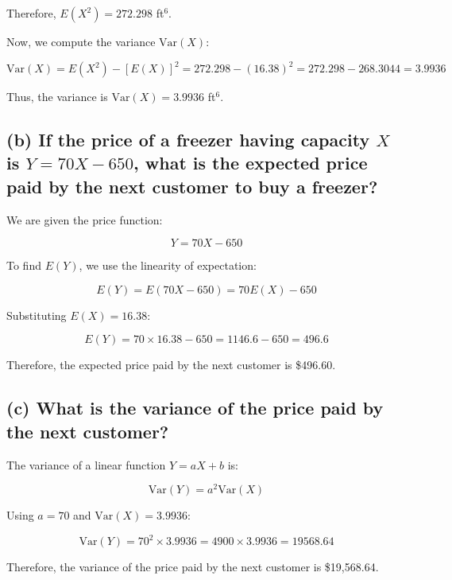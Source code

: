 \documentclass{article}
\begin{document}
Therefore, \( E(X^2) = 272.298 \) ft\(^6\).

Now, we compute the variance \( \text{Var}(X) \):

\[
\text{Var}(X) = E(X^2) - [E(X)]^2 = 272.298 - (16.38)^2 = 272.298 - 268.3044 = 3.9936
\]

Thus, the variance is \( \text{Var}(X) = 3.9936 \) ft\(^6\).

\subsection*{(b) If the price of a freezer having capacity \( X \) is \( Y = 70X - 650 \), what is the expected price paid by the next customer to buy a freezer?}

We are given the price function:

\[
Y = 70X - 650
\]

To find \( E(Y) \), we use the linearity of expectation:

\[
E(Y) = E(70X - 650) = 70E(X) - 650
\]

Substituting \( E(X) = 16.38 \):

\[
E(Y) = 70 \times 16.38 - 650 = 1146.6 - 650 = 496.6
\]

Therefore, the expected price paid by the next customer is \$496.60.

\subsection*{(c) What is the variance of the price paid by the next customer?}

The variance of a linear function \( Y = aX + b \) is:

\[
\text{Var}(Y) = a^2 \text{Var}(X)
\]

Using \( a = 70 \) and \( \text{Var}(X) = 3.9936 \):

\[
\text{Var}(Y) = 70^2 \times 3.9936 = 4900 \times 3.9936 = 19568.64
\]

Therefore, the variance of the price paid by the next customer is \$19,568.64.
\end{document}
